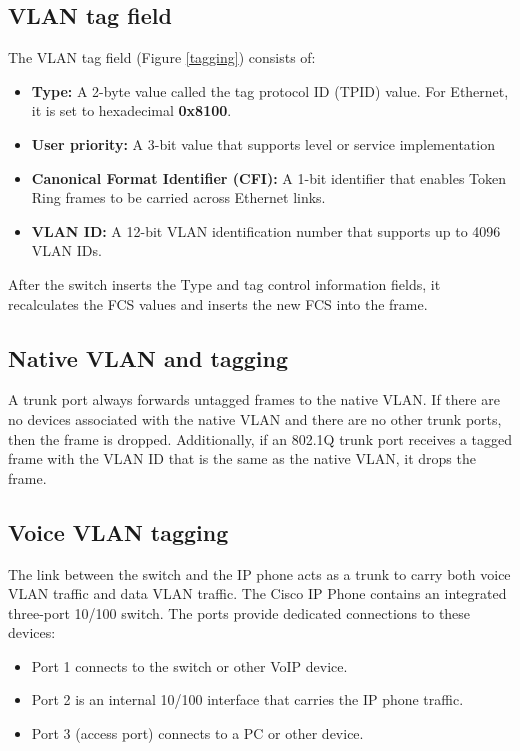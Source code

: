 \subsection{VLAN tag field}

The VLAN tag field (Figure \ref{tagging}) consists of: 

\begin{itemize}
\item \textbf{Type:} A 2-byte value called the tag protocol ID (TPID) value. For Ethernet, it is set to hexadecimal \textbf{0x8100}.

\item \textbf{User priority:} A 3-bit value that supports level or service implementation

\item \textbf{Canonical Format Identifier (CFI):} A 1-bit identifier that enables Token Ring frames to be carried across Ethernet links.

\item \textbf{VLAN ID:} A 12-bit VLAN identification number that supports up to 4096 VLAN IDs.
\end{itemize}

After the switch inserts the Type and tag control information fields, it recalculates the FCS values and inserts the new FCS into the frame.

\subsection{Native VLAN and tagging}

A trunk port always forwards untagged frames to the native VLAN. If there are no devices associated with the native VLAN and there are no other trunk ports, then the frame is dropped. Additionally, if an 802.1Q trunk port receives a tagged frame with the VLAN ID that is the same as the native VLAN, it drops the frame.

\subsection{Voice VLAN tagging}

The link between the switch and the IP phone acts as a trunk to carry both voice VLAN traffic and data VLAN traffic. The Cisco IP Phone contains an integrated three-port 10/100 switch. The ports provide dedicated connections to these devices:

\begin{itemize}
\item Port 1 connects to the switch or other VoIP device.
\item Port 2 is an internal 10/100 interface that carries the IP phone traffic.
\item Port 3 (access port) connects to a PC or other device.
\end{itemize}

